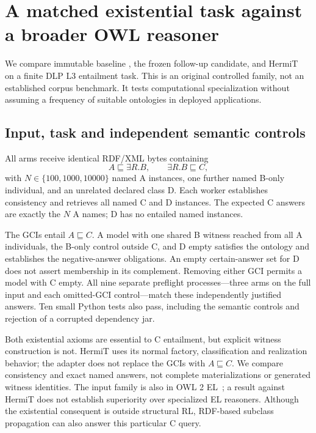 \section{A matched existential task against a broader OWL reasoner}
\label{sec:hermit}
We compare immutable baseline , the frozen follow-up candidate,
and HermiT~\cite{glimm2014hermit} on a finite DLP L3 entailment task. This is an
original controlled family, not an established corpus benchmark. It tests
computational specialization without assuming a frequency of suitable
ontologies in deployed applications.

\subsection{Input, task and independent semantic controls}
All arms receive identical RDF/XML bytes containing
\[
 A\sqsubseteq\exists R.B,\qquad \exists R.B\sqsubseteq C,
\]
with $N\in\{100,1000,10000\}$ named A instances, one further named B-only
individual, and an unrelated declared class D. Each worker establishes
consistency and retrieves all named C and D instances. The expected C answers
are exactly the $N$ A names; D has no entailed named instances.

The GCIs entail $A\sqsubseteq C$. A model with one shared B witness reached
from all A individuals, the B-only control outside C, and D empty satisfies
the ontology and establishes the negative-answer obligations. An empty
certain-answer set for D does not assert membership in its complement.
Removing either GCI permits a model with C empty. All nine separate preflight
processes---three arms on the full input and each omitted-GCI control---match
these independently justified answers. Ten small Python tests also pass,
including the semantic controls and rejection of a corrupted dependency jar.

Both existential axioms are essential to C entailment, but explicit witness
construction is not. HermiT uses its normal factory, classification and
realization behavior; the adapter does not replace the GCIs with
$A\sqsubseteq C$. We compare consistency and exact named answers, not complete
materializations or generated witness identities. The input family is also in
OWL 2 EL~\cite{owlprofiles2012}; a result against HermiT does not establish
superiority over specialized EL reasoners. Although the existential consequent
is outside structural RL, RDF-based subclass propagation can also answer this
particular C query.

